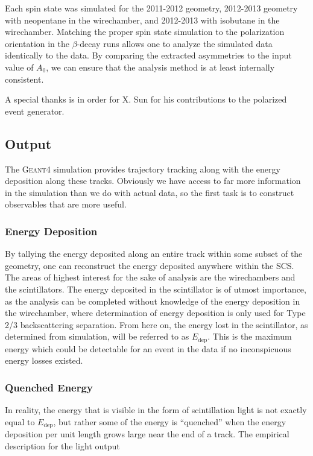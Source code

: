 Each spin state was simulated for the 2011-2012 geometry, 2012-2013 geometry with neopentane in the wirechamber,
and 2012-2013 with isobutane in the wirechamber. Matching the proper spin state simulation to the polarization orientation
in the $\beta$-decay runs allows one to analyze the simulated data identically to the data. By comparing the
extracted asymmetries to the input value of $A_0$, we can ensure that the analysis method is at least internally
consistent.

A special thanks is in order for X. Sun for his contributions to the polarized event generator.

\subsection{Output}
The \textsc{Geant4} simulation provides trajectory tracking along with
the energy deposition along these tracks. Obviously we have access to far
more information in the simulation than we do with actual data, so the first
task is to construct observables that are more useful.

\subsubsection{Energy Deposition}
By tallying the energy deposited along an entire track within some subset
of the geometry, one can reconstruct the energy deposited anywhere within
the SCS. The areas of highest interest for the sake of analysis are the
wirechambers and the scintillators. The energy deposited in the scintillator
is of utmost importance, as the analysis can be completed without knowledge
of the energy deposition in the wirechamber, where determination of energy
deposition is only used for Type 2/3 backscattering separation. From here on,
the energy lost in the scintillator, as determined from simulation, will be
referred to as $E_{\mathrm{dep}}$. This is the maximum energy which could be detectable
for an event in the data if no inconspicuous energy losses existed.

\subsubsection{Quenched Energy} \label{sssec:Equenched}
In reality, the energy that is visible in the form of scintillation light is not exactly
equal to $E_{\mathrm{dep}}$, but rather some of the energy is ``quenched'' when
the energy deposition per unit length grows large near the end of a track. The
empirical description for the light output 


